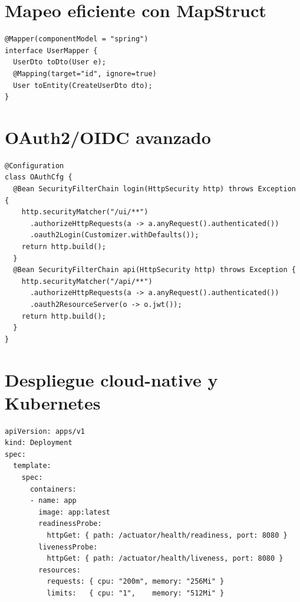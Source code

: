 \documentclass[11pt,a4paper]{article}
\begin{document}
\section{Mapeo eficiente con MapStruct}
\begin{lstlisting}[style=javastyle, caption={Mapper con @Mapper(componentModel="spring")}] 
@Mapper(componentModel = "spring")
interface UserMapper {
  UserDto toDto(User e);
  @Mapping(target="id", ignore=true)
  User toEntity(CreateUserDto dto);
}
\end{lstlisting}

\section{OAuth2/OIDC avanzado}
\begin{lstlisting}[style=javastyle, caption={Client OIDC (login) y Resource Server}]
@Configuration
class OAuthCfg {
  @Bean SecurityFilterChain login(HttpSecurity http) throws Exception {
    http.securityMatcher("/ui/**")
      .authorizeHttpRequests(a -> a.anyRequest().authenticated())
      .oauth2Login(Customizer.withDefaults());
    return http.build();
  }
  @Bean SecurityFilterChain api(HttpSecurity http) throws Exception {
    http.securityMatcher("/api/**")
      .authorizeHttpRequests(a -> a.anyRequest().authenticated())
      .oauth2ResourceServer(o -> o.jwt());
    return http.build();
  }
}
\end{lstlisting}

\section{Despliegue cloud-native y Kubernetes}
\begin{lstlisting}[style=yamlstyle, caption={Probes y recursos}] 
apiVersion: apps/v1
kind: Deployment
spec:
  template:
    spec:
      containers:
      - name: app
        image: app:latest
        readinessProbe:
          httpGet: { path: /actuator/health/readiness, port: 8080 }
        livenessProbe:
          httpGet: { path: /actuator/health/liveness, port: 8080 }
        resources:
          requests: { cpu: "200m", memory: "256Mi" }
          limits:   { cpu: "1",    memory: "512Mi" }
\end{lstlisting}
\end{document}
